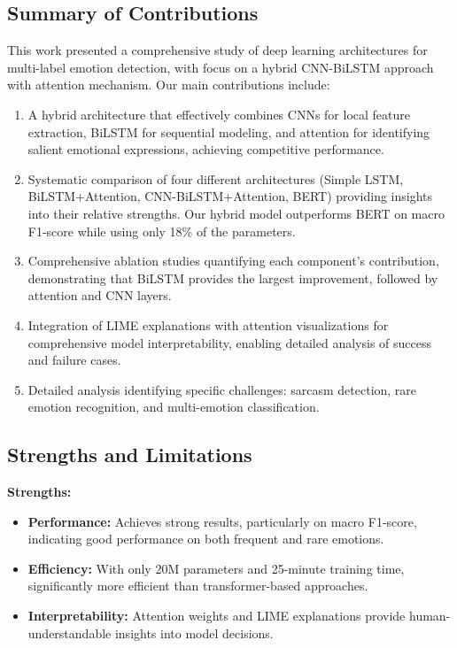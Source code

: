 \documentclass[12pt,a4paper]{article}
\begin{document}
\subsection{Summary of Contributions}

This work presented a comprehensive study of deep learning architectures for multi-label emotion detection, with focus on a hybrid CNN-BiLSTM approach with attention mechanism. Our main contributions include:

\begin{enumerate}
    \item A hybrid architecture that effectively combines CNNs for local feature extraction, BiLSTM for sequential modeling, and attention for identifying salient emotional expressions, achieving competitive performance.
    
    \item Systematic comparison of four different architectures (Simple LSTM, BiLSTM+Attention, CNN-BiLSTM+Attention, BERT) providing insights into their relative strengths. Our hybrid model outperforms BERT on macro F1-score while using only 18\% of the parameters.
    
    \item Comprehensive ablation studies quantifying each component's contribution, demonstrating that BiLSTM provides the largest improvement, followed by attention and CNN layers.
    
    \item Integration of LIME explanations with attention visualizations for comprehensive model interpretability, enabling detailed analysis of success and failure cases.
    
    \item Detailed analysis identifying specific challenges: sarcasm detection, rare emotion recognition, and multi-emotion classification.
\end{enumerate}

\subsection{Strengths and Limitations}

\textbf{Strengths:}
\begin{itemize}
    \item \textbf{Performance:} Achieves strong results, particularly on macro F1-score, indicating good performance on both frequent and rare emotions.
    \item \textbf{Efficiency:} With only 20M parameters and 25-minute training time, significantly more efficient than transformer-based approaches.
    \item \textbf{Interpretability:} Attention weights and LIME explanations provide human-understandable insights into model decisions.
\end{itemize}
\end{document}
